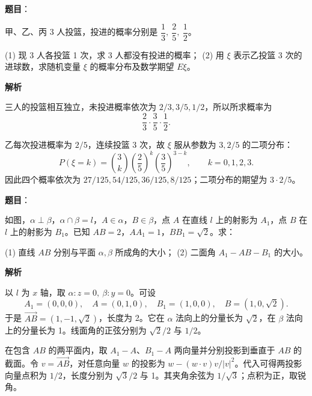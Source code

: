 \begin{answer}

\textbf{题目}：

甲、乙、丙 3 人投篮，投进的概率分别是 \(\dfrac13,\ \dfrac25,\ \dfrac12\)。

(1) 现 3 人各投篮 1 次，求 3 人都没有投进的概率；
(2) 用 \(\xi\) 表示乙投篮 3 次的进球数，求随机变量 \(\xi\) 的概率分布及数学期望 \(E\xi\)。

\textbf{解析}


三人的投篮相互独立，未投进概率依次为 \(2/3,3/5,1/2\)，所以所求概率为
\nopagebreak[4]
\[
\frac23\cdot\frac35\cdot\frac12.
\]


乙每次投进概率为 \(2/5\)，连续投篮 3 次，故 \(\xi\) 服从参数为 \(3,2/5\) 的二项分布：
\nopagebreak[4]
\[
P(\xi=k)=\binom3k\left(\frac25\right)^k\left(\frac35\right)^{3-k},
\qquad k=0,1,2,3.
\]
因此四个概率依次为 \(27/125,54/125,36/125,8/125\)；二项分布的期望为 \(3\cdot2/5\)。



\end{answer}
\begin{answer}

\textbf{题目}：

如图，\(\alpha\perp\beta\)，\(\alpha\cap\beta=l\)，\(A\in\alpha\)，\(B\in\beta\)，点 \(A\) 在直线 \(l\) 上的射影为 \(A_1\)，点 \(B\) 在 \(l\) 上的射影为 \(B_1\)。已知 \(AB=2\)，\(AA_1=1\)，\(BB_1=\sqrt2\)。求：

(1) 直线 \(AB\) 分别与平面 \(\alpha,\beta\) 所成角的大小；
(2) 二面角 \(A_1-AB-B_1\) 的大小。
\nopagebreak[4]
\begin{center}\end{center}
\nopagebreak[4]
\textbf{解析}


以 \(l\) 为 \(x\) 轴，取 \(\alpha:z=0,\ \beta:y=0\)。可设
\nopagebreak[4]
\[
A_1=(0,0,0),\quad A=(0,1,0),\quad
B_1=(1,0,0),\quad B=(1,0,\sqrt2).
\]
于是 \(\overrightarrow{AB}=(1,-1,\sqrt2)\)，长度为 2。它在 \(\alpha\) 法向上的分量长为 \(\sqrt2\)，在 \(\beta\) 法向上的分量长为 1。线面角的正弦分别为 \(\sqrt2/2\) 与 \(1/2\)。


在包含 \(AB\) 的两平面内，取 \(A_1-A\)、\(B_1-A\) 两向量并分别投影到垂直于 \(AB\) 的截面。令 \(v=\overrightarrow{AB}\)，对任意向量 \(w\) 的投影为 \(w-(w\cdot v)v/|v|^2\)。代入可得两投影向量点积为 \(1/2\)，长度分别为 \(\sqrt3/2\) 与 1。其夹角余弦为 \(1/\sqrt3\)；点积为正，取锐角。



\end{answer}
